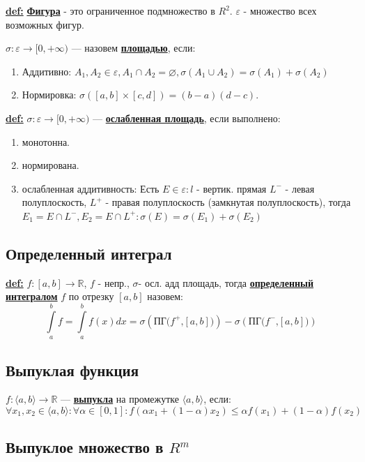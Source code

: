 \documentclass{article}
\renewcommand{\emptyset}{\varnothing}
\newcommand{\dint}{\displaystyle \int}
\newcommand{\deff}[1]{\underline{\textbf{#1}}}
\begin{document}
\deff{def:} \deff{Фигура} - это ограниченное подмножество в $R^2$. $\varepsilon$ - множество всех возможных фигур.

$\sigma: \varepsilon \rightarrow [0,+\infty)$ ---  назовем \deff{площадью}, если:
\begin{enumerate}
    \item Аддитивно: $A_1,A_2 \in \varepsilon, A_1\cap A_2 = \emptyset, \sigma(A_1\cup A_2) = \sigma(A_1)+\sigma(A_2)$
\item Нормировка: $\sigma ([a,b]\times[c,d]) = (b-a)(d-c)$.
\end{enumerate}


\deff{def:}  $\sigma:\varepsilon\rightarrow [0,+\infty)$ --- \deff{ослабленная площадь}, если выполнено:
\begin{enumerate}
    \item монотонна.
    \item нормирована.
    \item ослабленная аддитивность: Есть $E \in \varepsilon: l $ - вертик. прямая $L^-$ - левая полуплоскость, $L^{+}$ - правая полуплоскость (замкнутая полуплоскость), тогда  $E_1 = E\cap L^-, E_2 = E \cap L^+: \sigma(E)=\sigma(E_1)+\sigma(E_2)$
\end{enumerate}

\subsection{Определенный интеграл}

\deff{def:} $f: [a,b] \rightarrow \mathbb{R}$, $f$ - непр., $\sigma $- осл. адд площадь, тогда \deff{определенный интегралом} $f$ по отрезку $[a,b]$ назовем: $$\dint\limits_{a}^b f =\dint\limits_{a}^b f(x) dx =\sigma(\text{ПГ($f^+$,$[a,b]$)})-\sigma(\text{ПГ($f^-$,$[a,b]$)})$$

\subsection{Выпуклая функция}

 $f:\langle a,b\rangle\rightarrow \mathbb{R}$ --- \deff{выпукла} на промежутке $\langle a,b\rangle$, если:
$$\forall x_1,x_2 \in \langle a,b \rangle: \forall \alpha \in[0,1]:f(\alpha x_1+(1-\alpha)x_2)\leq \alpha f(x_1) + (1-\alpha) f(x_2)$$

\subsection{Выпуклое множество в $R^m$}
\end{document}
